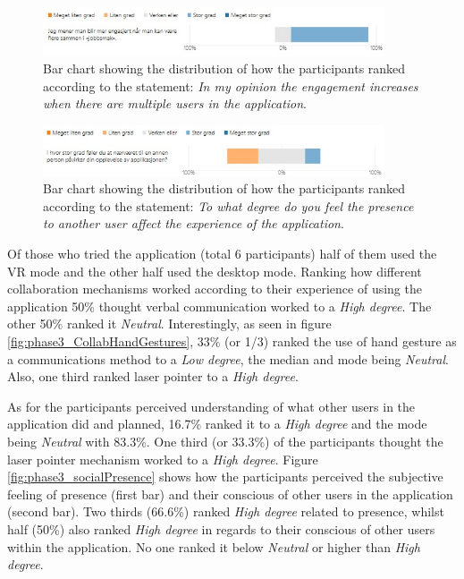 \begin{figure}[H]
  \centering
   \captionsetup{width=.8\linewidth}
    \includegraphics[width=0.9\textwidth]{fig/phase_3/survey/ValgKompAppEngasjement.jpg}
 \caption{Bar chart showing the distribution of how the participants ranked according to the statement: \textit{In my opinion the engagement increases when there are multiple users in the application}.}
\label{fig:phase3_SurveyEngagementIncreased}
\end{figure}


\begin{figure}[H]
  \centering
   \captionsetup{width=.8\linewidth}
    \includegraphics[width=0.9\textwidth]{fig/phase_3/survey/ValgKompAppPrecence.jpg}
 \caption{Bar chart showing the distribution of how the participants ranked according to the statement: \textit{To what degree do you feel the presence to another user affect the experience of the application}.}
\label{fig:phase3_SurveyPrecenceIncrease}
\end{figure}




Of those who tried the application (total 6 participants) half of them used the VR mode and the other half used the desktop mode. Ranking how different collaboration mechanisms worked according to their experience of using the application 50\% thought verbal communication worked to a \textit{High degree}. The other 50\% ranked it \textit{Neutral}. Interestingly, as seen in figure \ref{fig:phase3_CollabHandGestures}, 33\% (or 1/3) ranked the use of hand gesture as a communications method to a \textit{Low degree}, the median and mode being \textit{Neutral}. Also, one third ranked laser pointer to a \textit{High degree}.

As for the participants perceived understanding of what other users in the application did and planned, 16.7\% ranked it to a \textit{High degree} and the mode being \textit{Neutral} with 83.3\%. 
One third (or 33.3\%) of the participants thought the laser pointer mechanism worked to a \textit{High degree}. 
Figure \ref{fig:phase3_socialPresence} shows how the participants perceived the subjective feeling of presence (first bar) and their conscious of other users in the application (second bar). Two thirds (66.6\%) ranked \textit{High degree} related to presence, whilst half (50\%) also ranked \textit{High degree} in regards to their 
conscious of other users within the application. No one ranked it below \textit{Neutral} or higher than \textit{High degree}. 

